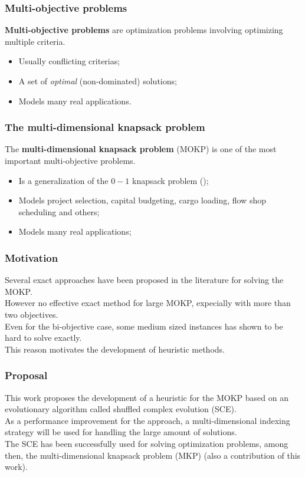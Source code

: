 
\begin{frame}
\frametitle{Multi-objective problems}
\textbf{Multi-objective problems} are optimization problems involving optimizing multiple criteria.
\pause
\begin{itemize}
  \item{ Usually conflicting criterias; }\pause
  \item{ A set of \textit{optimal} (non-dominated) solutions; } \pause
  \item{ Models many real applications. }
\end{itemize}
\vfill
\end{frame}

\begin{frame}
\frametitle{The multi-dimensional knapsack problem}
The \textbf{multi-dimensional knapsack problem} (MOKP)
is one of the most important multi-objective problems.
\pause
\begin{itemize}
  \item{ Is a generalization of the $0-1$ knapsack problem (\nphard); }\pause
  \item{ Models project selection, capital budgeting, cargo loading, flow shop scheduling and others;} \pause
  \item{ Models many real applications; }
\end{itemize}
\end{frame}

\begin{frame}
\frametitle{Motivation}
Several exact approaches have been proposed in the literature for
solving the MOKP. \\ \pause
\vfill
However no effective exact method for large MOKP, expecially with
more than two objectives. \\ \pause
\vfill
Even for the bi-objective case, some medium sized instances
has shown to be hard to solve exactly. \\ \pause
\vfill
This reason motivates the development of heuristic methods.
\vfill
\end{frame}

\begin{frame}
\frametitle{Proposal}
This work proposes the development of a heuristic for the MOKP
based on an evolutionary algorithm called shuffled complex evolution (SCE).
\\ \medskip \pause
As a performance improvement for the approach,
a multi-dimensional indexing strategy
will be used for handling the large amount of solutions.
\\ \medskip \pause
The SCE has been successfully used for solving optimization problems, among then,
the multi-dimensional knapsack problem (MKP) (also a contribution of this work).
\end{frame}

